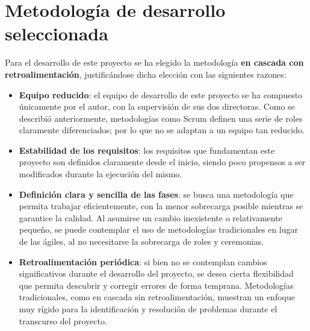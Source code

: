 \section{Metodología de desarrollo seleccionada}

    Para el desarrollo de este proyecto se ha elegido la metodología \textbf{en cascada con retroalimentación}, justificándose dicha elección con las siguientes razones:
    
    \begin{itemize}
        \item \textbf{Equipo reducido}: el equipo de desarrollo de este proyecto se ha compuesto únicamente por el autor, con la supervisión de sus dos directoras. Como se describió anteriormente, metodologías como Scrum definen una serie de roles claramente diferenciados; por lo que no se adaptan a un equipo tan reducido.
        \item \textbf{Estabilidad de los requisitos}: los requisitos que fundamentan este proyecto son definidos claramente desde el inicio, siendo poco propensos a ser modificados durante la ejecución del mismo. 
        \item \textbf{Definición clara y sencilla de las fases}: se busca una metodología que permita trabajar eficientemente, con la menor sobrecarga posible mientras se garantice la calidad. Al asumirse un cambio inexistente o relativamente pequeño, se puede contemplar el uso de metodologías tradicionales en lugar de las ágiles, al no necesitarse la sobrecarga de roles y ceremonias. 
        \item \textbf{Retroalimentación periódica}: si bien no se contemplan cambios significativos durante el desarrollo del proyecto, se desea cierta flexibilidad que permita descubrir y corregir errores de forma temprana. Metodologías tradicionales, como en cascada sin retroalimentación, muestran un enfoque muy rígido para la identificación y resolución de problemas durante el transcurso del proyecto.
    \end{itemize}
